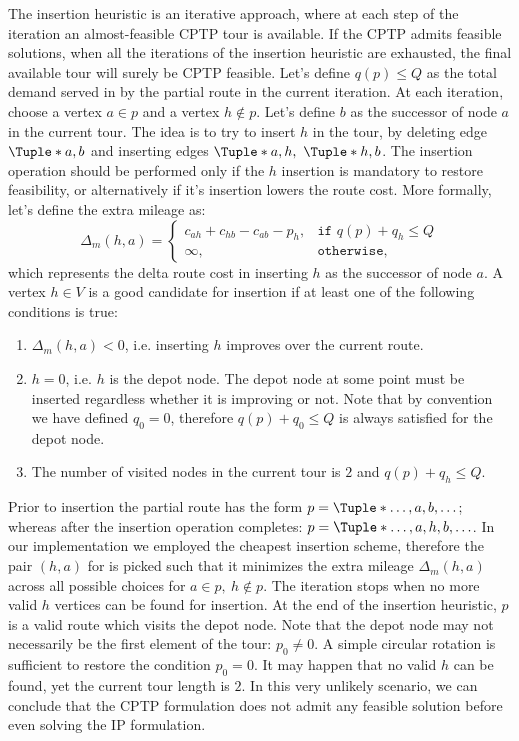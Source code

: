 The insertion heuristic is an iterative approach,
where at each step of the iteration
an almost-feasible CPTP tour is available.
If the CPTP admits feasible solutions,
when all the iterations of the insertion heuristic are exhausted,
the final available tour will surely be CPTP feasible.
Let's define $q(p) \le Q$ as the total demand served
in by the partial route in the current iteration.
At each iteration,
choose a vertex $a \in p$ and a vertex $h \notin p$.
Let's define $b$ as the successor of node $a$ in the current tour.
The idea is to try to insert $h$ in the tour,
by deleting edge $\Tuple*{a, b}$
and inserting edges $\Tuple*{a, h},\ \Tuple*{h, b}$.
The insertion operation should be performed only
if the $h$ insertion is mandatory to restore feasibility,
or alternatively if it's insertion lowers the route cost.
More formally, let's define the extra mileage as:
\begin{equation}
	\Delta_m(h, a) =
	\begin{cases}
		c_{ah} + c_{hb} - c_{ab} - p_h, & \texttt{if } q(p) + q_h \le Q \\
		\infty,                         & \texttt{otherwise},
	\end{cases}
\end{equation}
which represents the delta route cost in inserting $h$ as the successor of node $a$.
A vertex $h \in V$ is a good candidate for insertion
if at least one of the following conditions is true:
\begin{enumerate}
	\item $\Delta_m(h, a) < 0$, i.e. inserting $h$ improves over the current route.
	\item $h = 0$, i.e. $h$ is the depot node.
	      The depot node at some point must be inserted regardless whether it is improving or not.
	      Note that by convention we have defined $q_0 = 0$,
	      therefore $q(p) + q_0 \le Q$ is always satisfied for the depot node.
	\item The number of visited nodes in the current tour is $2$ and $q(p) + q_h \le Q$.
\end{enumerate}

Prior to insertion the partial route has the form $p = \Tuple*{\dots, a, b, \dots}$;
whereas after the insertion operation completes: $p = \Tuple*{\dots, a, h, b, \dots}$.
In our implementation we employed the cheapest insertion scheme,
therefore the pair $(h, a)$ for is picked such that it minimizes the extra mileage $\Delta_m(h, a)$
across all possible choices for $a \in p,\ h \notin p$.
The iteration stops when no more valid $h$ vertices can be found for insertion.
At the end of the insertion heuristic, $p$ is a valid route which visits the depot node.
Note that the depot node may not necessarily be the first element of the tour: $p_0 \ne 0$.
A simple circular rotation is sufficient to restore the condition $p_0 = 0$.
It may happen that no valid $h$ can be found,
yet the current tour length is $2$.
In this very unlikely scenario,
we can conclude that the CPTP formulation does not admit any feasible solution
before even solving the IP formulation.

